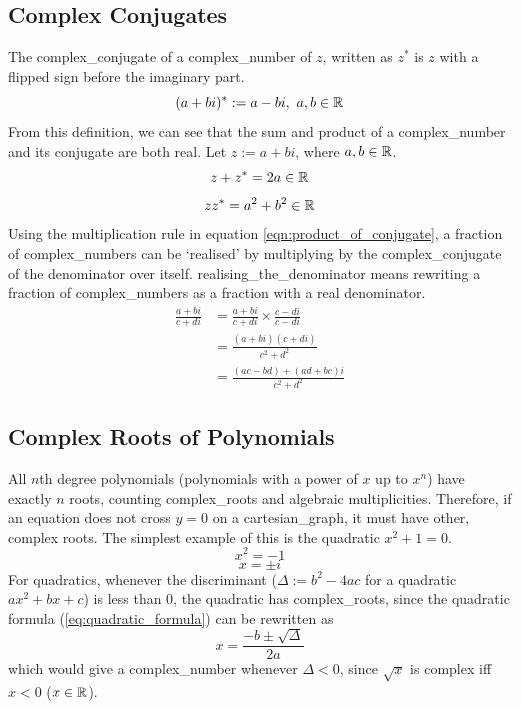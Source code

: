     \subsection{Complex Conjugates}
        The \gls{complex_conjugate} of a \gls{complex_number} of $z$, written as $z^*$ is $z$ with a flipped sign before the imaginary part.
        \begin{equation}
            (a+bi)^*:=a-bi,\ a,b\in\operatorname{\mathbb{R}}
        \end{equation}
        From this definition, we can see that the sum and product of a \gls{complex_number} and its conjugate are both real.
        Let $z:=a+bi$, where $a,b\in\operatorname{\mathbb{R}}$.
        \begin{equation} \label{eqn:sum_of_conjugate}
            z+z^*=2a\in\operatorname{\mathbb{R}}
        \end{equation}
        \begin{equation} \label{eqn:product_of_conjugate}
            zz^*=a^2+b^2\in\operatorname{\mathbb{R}}
        \end{equation}
        Using the multiplication rule in equation \ref{eqn:product_of_conjugate}, a fraction of \glspl{complex_number} can be `realised' by multiplying by the \gls{complex_conjugate} of the denominator over itself.
        \Gls{realising_the_denominator} means rewriting a fraction of \glspl{complex_number} as a fraction with a real denominator.
        \begin{equation} \label{eqn:realise_denominator}
        \begin{split}
            \frac{a+bi}{c+di}&=\frac{a+bi}{c+di}\times\frac{c-di}{c-di}\\
            &=\frac{(a+bi)(c+di)}{c^2+d^2}\\
            &=\frac{(ac-bd)+(ad+bc)i}{c^2+d^2}
        \end{split}
        \end{equation}
    \subsection{Complex Roots of Polynomials}
        All $n$th degree \glspl{polynomial} (\glspl{polynomial} with a power of $x$ up to $x^n$) have exactly $n$ \glspl{root}, counting \glspl{complex_root} and algebraic multiplicities.
        Therefore, if an equation does not cross $y=0$ on a \gls{cartesian_graph}, it must have other, complex \glspl{root}.
        The simplest example of this is the \gls{quadratic} $x^2+1=0$.
        \[x^2=-1\]
        \[x=\pm i\]
        For \glspl{quadratic}, whenever the discriminant ($\Delta:=b^2-4ac$ for a \gls{quadratic} $ax^2+bx+c$) is less than $0$, the \gls{quadratic} has \glspl{complex_root}, since the quadratic formula (\ref{eq:quadratic_formula}) can be rewritten as
        \[x=\frac{-b\pm\sqrt{\Delta}}{2a}\]
        which would give a \gls{complex_number} whenever $\Delta<0$, since $\sqrt{x}$ is complex iff $x<0$ ($x\in\operatorname{\mathbb{R}}$).
        
